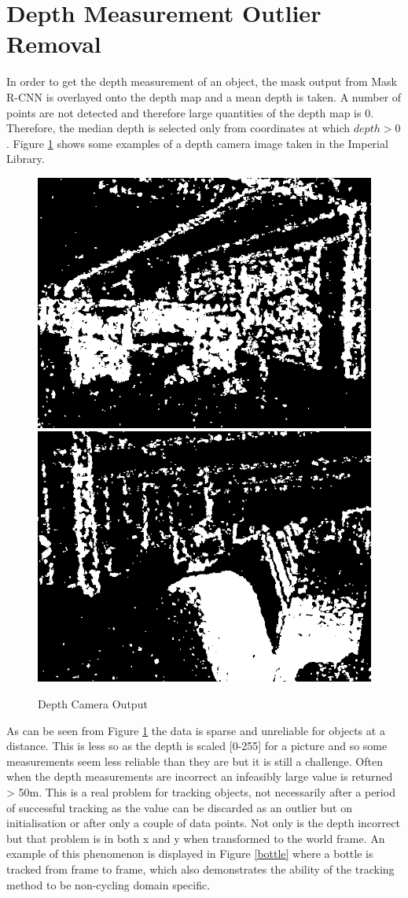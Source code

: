 \documentclass[11pt,twoside]{report}
\begin{document}
\section{Depth Measurement Outlier Removal} \label{Depth_approx}

In order to get the depth measurement of an object, the mask output from Mask R-CNN is overlayed onto the depth map and a mean depth is taken. A number of points are not detected and therefore large quantities of the depth map is 0. Therefore, the median depth is selected only from coordinates at which $depth>0$. Figure \ref{DCO} shows some examples of a depth camera image taken in the Imperial Library.

\noindent \begin{figure}[h!]
	\includegraphics[width = 0.5\hsize]{figures/depth_image_1.png}
	\includegraphics[width = 0.5\hsize]{figures/depth_image_2.png}
	\caption{Depth Camera Output}
	\label{DCO}
\end{figure}

As can be seen from Figure \ref{DCO} the data is sparse and unreliable for objects at a distance. This is less so as the depth is scaled [0-255] for a picture and so some measurements seem less reliable than they are but it is still a challenge. Often when the depth measurements are incorrect an infeasibly large value is returned > 50m. This is a real problem for tracking objects, not necessarily after a period of successful tracking as the value can be discarded as an outlier but on initialisation or after only a couple of data points. Not only is the depth incorrect but that problem is in both x and y when transformed to the world frame. An example of this phenomenon is displayed in Figure \ref{bottle} where a bottle is tracked from frame to frame, which also demonstrates the ability of the tracking method to be non-cycling domain specific.
\end{document}
